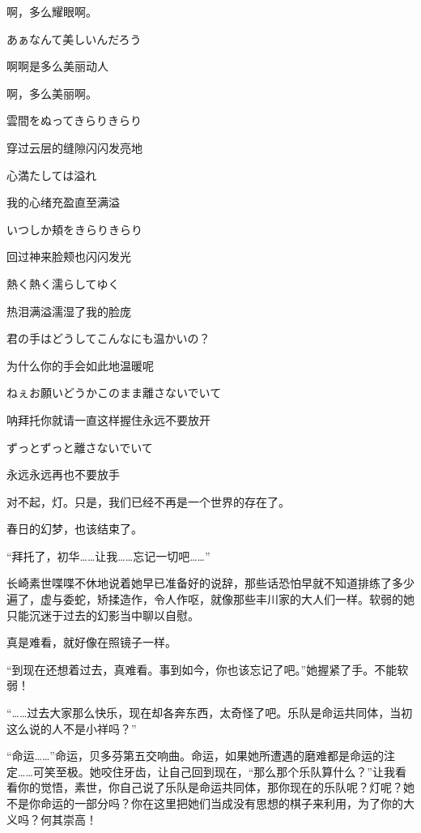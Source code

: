\documentclass{article}
\begin{document}
啊，多么耀眼啊。



あぁなんて美しいんだろう

啊啊是多么美丽动人



啊，多么美丽啊。



雲間をぬってきらりきらり

穿过云层的缝隙闪闪发亮地

心満たしては溢れ

我的心绪充盈直至满溢

いつしか頬をきらりきらり

回过神来脸颊也闪闪发光

熱く熱く濡らしてゆく

热泪满溢濡湿了我的脸庞

君の手はどうしてこんなにも温かいの？

为什么你的手会如此地温暖呢

ねぇお願いどうかこのまま離さないでいて

呐拜托你就请一直这样握住永远不要放开

ずっとずっと離さないでいて

永远永远再也不要放手



对不起，灯。只是，我们已经不再是一个世界的存在了。



春日的幻梦，也该结束了。



“拜托了，初华……让我……忘记一切吧……”



\newpage



长崎素世喋喋不休地说着她早已准备好的说辞，那些话恐怕早就不知道排练了多少遍了，虚与委蛇，矫揉造作，令人作呕，就像那些丰川家的大人们一样。软弱的她只能沉迷于过去的幻影当中聊以自慰。



真是难看，就好像在照镜子一样。



“到现在还想着过去，真难看。事到如今，你也该忘记了吧。”她握紧了手。不能软弱！



“……过去大家那么快乐，现在却各奔东西，太奇怪了吧。乐队是命运共同体，当初这么说的人不是小祥吗？”



“命运……”命运，贝多芬第五交响曲。命运，如果她所遭遇的磨难都是命运的注定……可笑至极。她咬住牙齿，让自己回到现在，“那么那个乐队算什么？”让我看看你的觉悟，素世，你自己说了乐队是命运共同体，那你现在的乐队呢？灯呢？她不是你命运的一部分吗？你在这里把她们当成没有思想的棋子来利用，为了你的大义吗？何其崇高！
\end{document}
